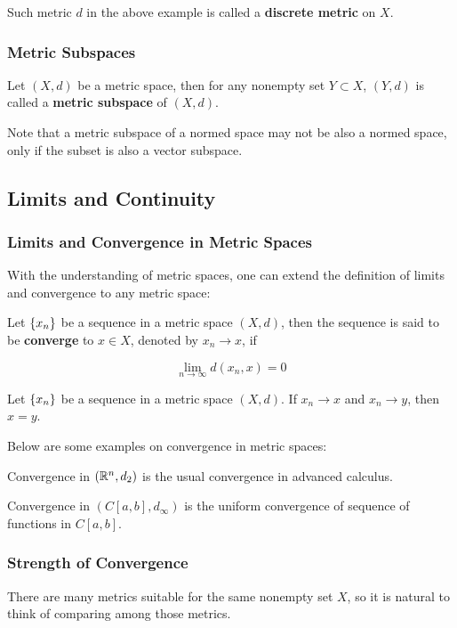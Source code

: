 \documentclass[a4paper,12pt]{article}
\begin{document}
Such metric $d$ in the above example is called a \textbf{discrete metric} on $X$.

\subsubsection{Metric Subspaces}
\begin{dft}
  Let $(X,d)$ be a metric space, then for any nonempty set $Y\subset X$, $(Y,d)$ is called a \textbf{metric subspace} of $(X,d)$.
\end{dft}\n

Note that a metric subspace of a normed space may not be also a normed space, only if the subset is also a vector subspace.

\subsection{Limits and Continuity}
\subsubsection{Limits and Convergence in Metric Spaces}
With the understanding of metric spaces, one can extend the definition of limits and convergence to any metric space:\n

\begin{dft}
  Let $\left\{ x_{n}\right\}$ be a sequence in a metric space $(X,d)$, then the sequence is said to be \textbf{converge} to $x\in X$, denoted by $x_{n}\to x$, if

  $$\lim_{n\to\infty}d(x_{n},x)=0$$
\end{dft}\n

\begin{pst}
  Let $\left\{ x_{n}\right\}$ be a sequence in a metric space $(X,d)$. If $x_{n}\to x$ and $x_{n}\to y$, then $x=y$.
\end{pst}\n

\begin{exm}
  Below are some examples on convergence in metric spaces:

  \begin{alist}
    \item Convergence in $(\mathbb{R}^{n},d_{2})$ is the usual convergence in advanced calculus.
    \item Convergence in $(C[a,b],d_{\infty})$ is the uniform convergence of sequence of functions in $C[a,b]$.
  \end{alist}
\end{exm}

\subsubsection{Strength of Convergence}
There are many metrics suitable for the same nonempty set $X$, so it is natural to think of comparing among those metrics.\n
\end{document}
